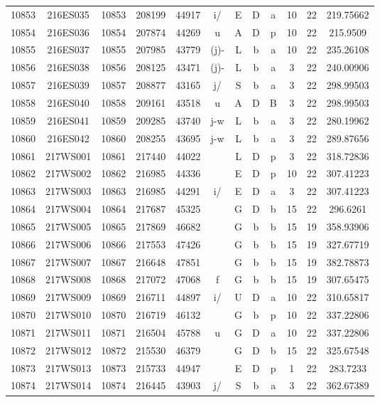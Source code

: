 \begin{tabular}{|*{12}{c|}}
10853 & 216ES035 & 10853 & 208199 & 44917 & i/ & E & D & a & 10 & 22 & 219.75662 \\ 
10854 & 216ES036 & 10854 & 207874 & 44269 & u & A & D & p & 10 & 22 & 215.9509 \\ 
10855 & 216ES037 & 10855 & 207985 & 43779 & (j)- & L & b & a & 10 & 22 & 235.26108 \\ 
10856 & 216ES038 & 10856 & 208125 & 43471 & (j)- & L & b & a & 3 & 22 & 240.00906 \\ 
10857 & 216ES039 & 10857 & 208877 & 43165 & j/ & S & b & a & 3 & 22 & 298.99503 \\ 
10858 & 216ES040 & 10858 & 209161 & 43518 & u & A & D & B & 3 & 22 & 298.99503 \\ 
10859 & 216ES041 & 10859 & 209285 & 43740 & j-w & L & b & a & 3 & 22 & 280.19962 \\ 
10860 & 216ES042 & 10860 & 208255 & 43695 & j-w & L & b & a & 3 & 22 & 289.87656 \\ 
10861 & 217WS001 & 10861 & 217440 & 44022 &  & L & D & p & 3 & 22 & 318.72836 \\ 
10862 & 217WS002 & 10862 & 216985 & 44336 &  & E & D & p & 10 & 22 & 307.41223 \\ 
10863 & 217WS003 & 10863 & 216985 & 44291 & i/ & E & D & a & 3 & 22 & 307.41223 \\ 
10864 & 217WS004 & 10864 & 217687 & 45325 &  & G & D & b & 15 & 22 & 296.6261 \\ 
10865 & 217WS005 & 10865 & 217869 & 46682 &  & G & b & b & 15 & 19 & 358.93906 \\ 
10866 & 217WS006 & 10866 & 217553 & 47426 &  & G & b & b & 15 & 19 & 327.67719 \\ 
10867 & 217WS007 & 10867 & 216648 & 47851 &  & G & b & b & 15 & 19 & 382.78873 \\ 
10868 & 217WS008 & 10868 & 217072 & 47068 & f & G & b & b & 15 & 19 & 307.65475 \\ 
10869 & 217WS009 & 10869 & 216711 & 44897 & i/ & U & D & a & 10 & 22 & 310.65817 \\ 
10870 & 217WS010 & 10870 & 216719 & 46132 &  & G & b & p & 10 & 22 & 337.22806 \\ 
10871 & 217WS011 & 10871 & 216504 & 45788 & u & G & D & a & 10 & 22 & 337.22806 \\ 
10872 & 217WS012 & 10872 & 215530 & 46379 &  & G & D & b & 15 & 22 & 325.67548 \\ 
10873 & 217WS013 & 10873 & 215733 & 44947 &  & E & D & p & 1 & 22 & 283.7233 \\ 
10874 & 217WS014 & 10874 & 216445 & 43903 & j/ & S & b & a & 3 & 22 & 362.67389 \\ 

\end{tabular}
